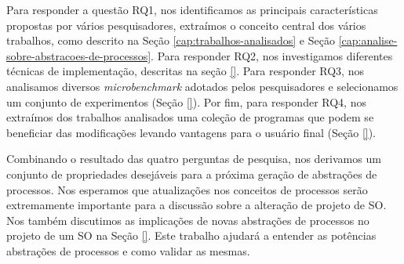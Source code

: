Para responder a questão RQ1, nos identificamos as principais características
propostas por vários pesquisadores, extraímos o conceito central dos vários
trabalhos, como descrito na Seção \ref{cap:trabalhos-analisados} e Seção
\ref{cap:analise-sobre-abstracoes-de-processos}. Para responder RQ2, nos
investigamos diferentes técnicas de implementação, descritas na seção \ref{}.
Para responder RQ3, nos analisamos diversos \emph{microbenchmark} adotados
pelos pesquisadores e selecionamos um conjunto de experimentos (Seção \ref{}).
Por fim, para responder RQ4, nos extraímos dos trabalhos analisados uma coleção
de programas que podem se beneficiar das modificações levando vantagens para o
usuário final (Seção \ref{}).

Combinando o resultado das quatro perguntas de pesquisa, nos derivamos um
conjunto de propriedades desejáveis para a próxima geração de abstrações de
processos. Nos esperamos que atualizações nos conceitos de processos serão
extremamente importante para a discussão sobre a alteração de projeto de SO.
Nos também discutimos as implicações de novas abstrações de processos no
projeto de um SO na Seção \ref{}. Este trabalho ajudará a entender as potências
abstrações de processos e como validar as mesmas.
